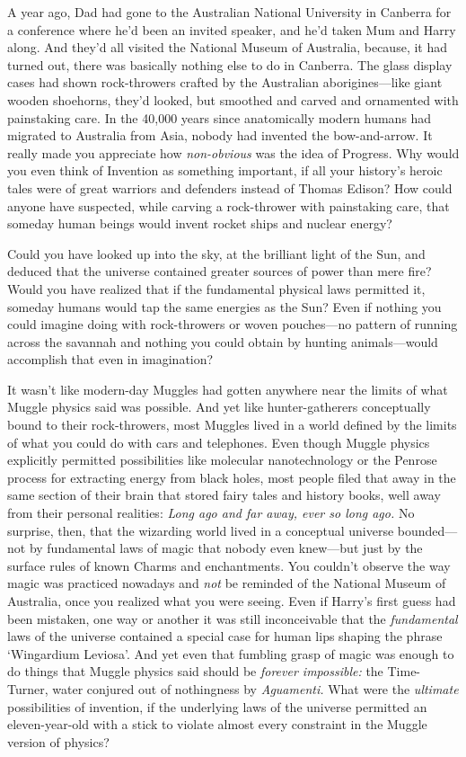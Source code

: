 A year ago, Dad had gone to the Australian National University in Canberra for
a conference where he'd been an invited speaker, and he'd taken Mum and Harry
along. And they'd all visited the National Museum of Australia, because, it had
turned out, there was basically nothing else to do in Canberra. The glass
display cases had shown rock-throwers crafted by the Australian
aborigines—like giant wooden shoehorns, they'd looked, but smoothed and
carved and ornamented with painstaking care. In the 40,000 years since
anatomically modern humans had migrated to Australia from Asia, nobody had
invented the bow-and-arrow. It really made you appreciate how
\emph{non-obvious} was the idea of Progress. Why would you even think of
Invention as something important, if all your history's heroic tales were of
great warriors and defenders instead of Thomas Edison? How could anyone have
suspected, while carving a rock-thrower with painstaking care, that someday
human beings would invent rocket ships and nuclear energy?

Could you have looked up into the sky, at the brilliant light of the Sun, and
deduced that the universe contained greater sources of power than mere fire?
Would you have realized that if the fundamental physical laws permitted it,
someday humans would tap the same energies as the Sun? Even if nothing you
could imagine doing with rock-throwers or woven pouches—no pattern of running
across the savannah and nothing you could obtain by hunting animals—would
accomplish that even in imagination?

It wasn't like modern-day Muggles had gotten anywhere near the limits of what
Muggle physics said was possible. And yet like hunter-gatherers conceptually
bound to their rock-throwers, most Muggles lived in a world defined by the
limits of what you could do with cars and telephones. Even though Muggle
physics explicitly permitted possibilities like molecular nanotechnology or the
Penrose process for extracting energy from black holes, most people filed that
away in the same section of their brain that stored fairy tales and history
books, well away from their personal realities: \emph{Long ago and far away,
ever so long ago.} No surprise, then, that the wizarding world lived in a
conceptual universe bounded—not by fundamental laws of magic that nobody even
knew—but just by the surface rules of known Charms and enchantments. You
couldn't observe the way magic was practiced nowadays and \emph{not} be
reminded of the National Museum of Australia, once you realized what you were
seeing. Even if Harry's first guess had been mistaken, one way or another it
was still inconceivable that the \emph{fundamental} laws of the universe
contained a special case for human lips shaping the phrase `Wingardium
Leviosa'. And yet even that fumbling grasp of magic was enough to do things
that Muggle physics said should be \emph{forever impossible:} the Time-Turner,
water conjured out of nothingness by \emph{Aguamenti.} What were the
\emph{ultimate} possibilities of invention, if the underlying laws of the
universe permitted an eleven-year-old with a stick to violate almost every
constraint in the Muggle version of physics?

